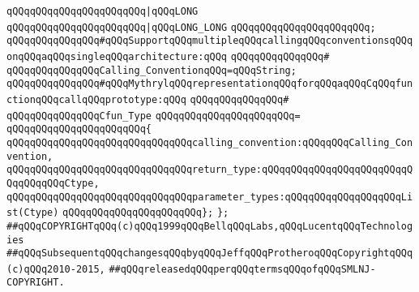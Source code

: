 \verb|qQQqqQQqqQQqqQQqqQQqqQQq|\verb#|qQQqLONG#\newline
\verb|qQQqqQQqqQQqqQQqqQQqqQQq|\verb#|qQQqLONG_LONG#\newline
\verb|qQQqqQQqqQQqqQQqqQQqqQQq;|\newline
\newline
\newline
\verb|qQQqqQQqqQQqqQQq#qQQqSupportqQQqmultipleqQQqcallingqQQqconventionsqQQqonqQQqaqQQqsingleqQQqarchitecture:qQQq|\newline
\verb|qQQqqQQqqQQqqQQq#|\newline
\verb|qQQqqQQqqQQqqQQqCalling_ConventionqQQq=qQQqString;|\newline
\newline
\verb|qQQqqQQqqQQqqQQq#qQQqMythrylqQQqrepresentationqQQqforqQQqaqQQqCqQQqfunctionqQQqcallqQQqprototype:qQQq|\newline
\verb|qQQqqQQqqQQqqQQq#|\newline
\verb|qQQqqQQqqQQqqQQqCfun_Type|\newline
\verb|qQQqqQQqqQQqqQQqqQQqqQQq=|\newline
\verb|qQQqqQQqqQQqqQQqqQQqqQQq{|\newline
\verb|qQQqqQQqqQQqqQQqqQQqqQQqqQQqqQQqcalling_convention:qQQqqQQqCalling_Convention,|\newline
\verb|qQQqqQQqqQQqqQQqqQQqqQQqqQQqqQQqreturn_type:qQQqqQQqqQQqqQQqqQQqqQQqqQQqqQQqqQQqCtype,|\newline
\verb|qQQqqQQqqQQqqQQqqQQqqQQqqQQqqQQqparameter_types:qQQqqQQqqQQqqQQqqQQqList(Ctype)|\newline
\verb|qQQqqQQqqQQqqQQqqQQqqQQq};|\newline
\newline
\verb|};|\newline
\newline
\newline
\verb|##qQQqCOPYRIGHTqQQq(c)qQQq1999qQQqBellqQQqLabs,qQQqLucentqQQqTechnologies|\newline
\verb|##qQQqSubsequentqQQqchangesqQQqbyqQQqJeffqQQqProtheroqQQqCopyrightqQQq(c)qQQq2010-2015,|\newline
\verb|##qQQqreleasedqQQqperqQQqtermsqQQqofqQQqSMLNJ-COPYRIGHT.|\newline

